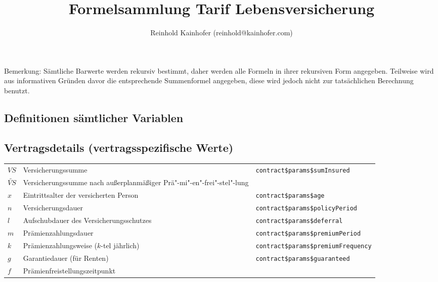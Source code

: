 \documentclass[a4paper,10pt]{article}
\title{\textbf{Formelsammlung Tarif Lebensversicherung}}
\author{Reinhold Kainhofer (reinhold@kainhofer.com)}
\begin{document}
\maketitle

%

Bemerkung: Sämtliche Barwerte werden rekursiv bestimmt, daher werden alle Formeln in ihrer rekursiven Form angegeben. Teilweise wird aus informativen Gründen davor die entsprechende Summenformel angegeben, diese wird jedoch nicht zur tatsächlichen Berechnung benutzt.

\tableofcontents


\begin{landscape}
\section{Definitionen sämtlicher Variablen}

\subsection{Vertragsdetails (vertragsspezifische Werte)}

\newenvironment{deftab}{\begin{longtable}{p{1.7cm}p{13cm}p{9cm}}}{\end{longtable}}

\begin{deftab}
 $VS$ & Versicherungssumme & \texttt{contract\$params\$sumInsured}\\
 $\widetilde{VS}$ & Versicherungssumme nach außerplanmäßiger Prä"-mi"-en"-frei"-stel"-lung\\[0.5em]
 $x$ & Eintrittsalter der versicherten Person & \texttt{contract\$params\$age}\\
 $n$ & Versicherungsdauer & \texttt{contract\$params\$policyPeriod}\\
 $l$ & Aufschubdauer des Versicherungsschutzes & \texttt{contract\$params\$deferral}\\
 $m$ & Prämienzahlungsdauer & \texttt{contract\$params\$premiumPeriod}\\
 $k$ & Prämienzahlungsweise ($k$-tel jährlich) & \texttt{contract\$params\$premiumFrequency}\\
 $g$ & Garantiedauer (für Renten)  & \texttt{contract\$params\$guaranteed}\\
 $f$ & Prämienfreistellungszeitpunkt\\[0.5em]


\end{deftab}
\end{landscape}
\end{document}
